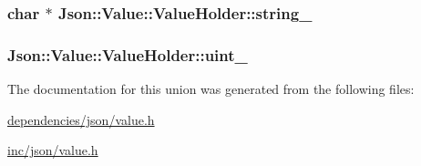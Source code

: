 \hypertarget{unionJson_1_1Value_1_1ValueHolder_afedf5861e3368a0a9587e499f1ac23b9}{
\subsubsection[{string\-\_\-}]{\setlength{\rightskip}{0pt plus 5cm}char $\ast$ Json\-::\-Value\-::\-Value\-Holder\-::string\-\_\-}}\label{d9/d18/unionJson_1_1Value_1_1ValueHolder_afedf5861e3368a0a9587e499f1ac23b9}
\hypertarget{unionJson_1_1Value_1_1ValueHolder_aac6f758fec8757ef1908fa7c329244a7}{
\subsubsection[{uint\-\_\-}]{ Json\-::\-Value\-::\-Value\-Holder\-::uint\-\_\-}}\label{d9/d18/unionJson_1_1Value_1_1ValueHolder_aac6f758fec8757ef1908fa7c329244a7}


The documentation for this union was generated from the following files\-:\begin{DoxyCompactItemize}
\item 
\hyperlink{dependencies_2json_2value_8h}{dependencies/json/value.\-h}\item 
\hyperlink{inc_2json_2value_8h}{inc/json/value.\-h}\end{DoxyCompactItemize}
